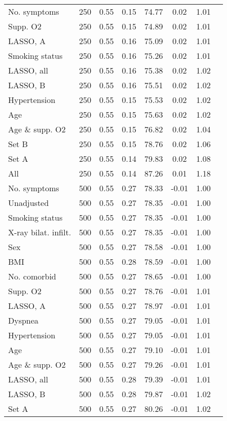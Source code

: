 \documentclass{article}
\begin{document}
{\begin{longtable}{lccccccc}
No. symptoms & 250 & 0.55 & 0.15 & 74.77 & 0.02 & 1.01\\
Supp. O2 & 250 & 0.55 & 0.15 & 74.89 & 0.02 & 1.01\\
LASSO, A & 250 & 0.55 & 0.16 & 75.09 & 0.02 & 1.01\\
Smoking status & 250 & 0.55 & 0.16 & 75.26 & 0.02 & 1.01\\
LASSO, all & 250 & 0.55 & 0.16 & 75.38 & 0.02 & 1.02\\
LASSO, B & 250 & 0.55 & 0.16 & 75.51 & 0.02 & 1.02\\
Hypertension & 250 & 0.55 & 0.15 & 75.53 & 0.02 & 1.02\\
Age & 250 & 0.55 & 0.15 & 75.63 & 0.02 & 1.02\\
Age \& supp. O2 & 250 & 0.55 & 0.15 & 76.82 & 0.02 & 1.04\\
Set B & 250 & 0.55 & 0.15 & 78.76 & 0.02 & 1.06\\
Set A & 250 & 0.55 & 0.14 & 79.83 & 0.02 & 1.08\\
All & 250 & 0.55 & 0.14 & 87.26 & 0.01 & 1.18\\ \midrule
No. symptoms & 500 & 0.55 & 0.27 & 78.33 & -0.01 & 1.00\\
Unadjusted & 500 & 0.55 & 0.27 & 78.35 & -0.01 & 1.00\\
Smoking status & 500 & 0.55 & 0.27 & 78.35 & -0.01 & 1.00\\
X-ray bilat. infilt. & 500 & 0.55 & 0.27 & 78.35 & -0.01 & 1.00\\
Sex & 500 & 0.55 & 0.27 & 78.58 & -0.01 & 1.00\\
BMI & 500 & 0.55 & 0.28 & 78.59 & -0.01 & 1.00\\
No. comorbid & 500 & 0.55 & 0.27 & 78.65 & -0.01 & 1.00\\
Supp. O2 & 500 & 0.55 & 0.27 & 78.76 & -0.01 & 1.01\\
LASSO, A & 500 & 0.55 & 0.27 & 78.97 & -0.01 & 1.01\\
Dyspnea & 500 & 0.55 & 0.27 & 79.05 & -0.01 & 1.01\\
Hypertension & 500 & 0.55 & 0.27 & 79.05 & -0.01 & 1.01\\
Age & 500 & 0.55 & 0.27 & 79.10 & -0.01 & 1.01\\
Age \& supp. O2 & 500 & 0.55 & 0.27 & 79.26 & -0.01 & 1.01\\
LASSO, all & 500 & 0.55 & 0.28 & 79.39 & -0.01 & 1.01\\
LASSO, B & 500 & 0.55 & 0.28 & 79.87 & -0.01 & 1.02\\
Set A & 500 & 0.55 & 0.27 & 80.26 & -0.01 & 1.02\\

\end{longtable}}
\end{document}
